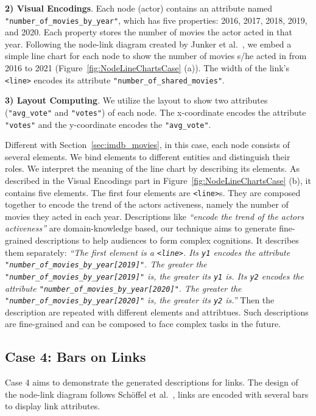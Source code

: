 \textbf{2) Visual Encodings}. 
Each node (actor) contains an attribute named \texttt{"number\_of\_movies\_by\_year"}, which has five properties: 2016, 2017, 2018, 2019, and 2020.
Each property stores the number of movies the actor acted in that year.
Following the node-link diagram created by Junker et al.~\cite{DBLP:journals/bmcbi/JunkerKS06}, 
we embed a simple line chart for each node to show the number of movies s/he acted in from 2016 to 2021 (Figure~\ref{fig:NodeLineChartsCase} (a)). 
The width of the link's \texttt{<line>} encodes its attribute \texttt{"number\_of\_shared\_movies"}.

\textbf{3) Layout Computing}. We utilize the layout to show two attributes (\texttt{"avg\_vote"} and \texttt{"votes"}) of each node. The x-coordinate encodes the attribute \texttt{"votes"} and the y-coordinate encodes the \texttt{"avg\_vote"}.

Different with Section~\ref{sec:imdb_movies}, in this case, each node consists of several elements.
We bind elements to different entities and distinguish their roles.
We interpret the meaning of the line chart by describing its elements.
As described in the Visual Encodings part in Figure~\ref{fig:NodeLineChartsCase} (b), it contains five elements.
The first four elements are \texttt{<line>}s.
They are composed together to encode the trend of the actors activeness, namely the number of movies they acted in each year.
Descriptions like \textit{``encode the trend of the actors activeness''} are domain-knowledge based,
our technique aims to generate fine-grained descriptions to help audiences to form complex cognitions.
It describes them separately: 
\textit{``The first element is a \texttt{<line>}. 
Its \texttt{y1} encodes the attribute \texttt{"number\_of\_movies\_by\_year[2019]"}. 
The greater the \texttt{"number\_of\_movies\_by\_year[2019]"} is, the greater its \texttt{y1} is. 
Its \texttt{y2} encodes the attribute \texttt{"number\_of\_movies\_by\_year[2020]"}.
The greater the \texttt{"number\_of\_movies\_by\_year[2020]"} is, the greater its \texttt{y2} is.''}
Then the description are repeated with different elements and attribtues.
Such descriptions are fine-grained and can be composed to face complex tasks in the future.


\subsection{Case 4: Bars on Links}
Case 4 aims to demonstrate the generated descriptions for links.
The design of the node-link diagram follows Sch{\"{o}}ffel et al.~\cite{DBLP:conf/iv/SchoffelSE16}, links are encoded with several bars to display link attributes.

